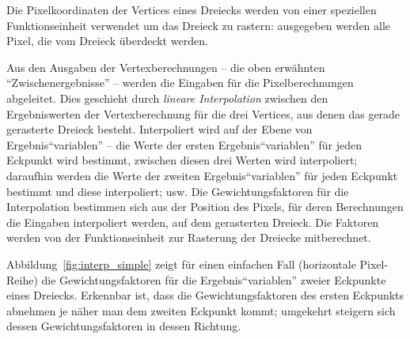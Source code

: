\documentclass[twoside,a4paper,fleqn,12pt]{book}
\begin{document}
Die Pixelkoordinaten der Vertices eines Dreiecks werden von einer speziellen Funktionseinheit verwendet um das Dreieck zu rastern:
ausgegeben werden alle Pixel, die vom Dreieck überdeckt werden. 

Aus den Ausgaben der Vertexberechnungen -- die oben erwähnten "`Zwischenergebnisse"' -- werden die Eingaben für die Pixelberechnungen abgeleitet.
Dies geschieht durch \emph{lineare Interpolation} zwischen den Ergebniswerten der Vertexberechnung für die drei Vertices, aus denen das gerade gerasterte
Dreieck besteht. Interpoliert wird auf der Ebene von Ergebnis"`variablen"' -- die Werte der ersten Ergebnis"`variablen"' für jeden Eckpunkt wird bestimmt,
zwischen diesen drei Werten wird interpoliert; daraufhin werden die Werte der zweiten Ergebnis"`variablen"' für jeden Eckpunkt bestimmt
und diese interpoliert; usw. Die Gewichtungsfaktoren für die Interpolation bestimmen sich aus der Position des Pixels, für deren Berechnungen
die Eingaben interpoliert werden, auf dem gerasterten Dreieck. Die Faktoren werden von der Funktionseinheit zur Rasterung der Dreiecke mitberechnet.

Abbildung~\ref{fig:interp_simple} zeigt für einen einfachen Fall (horizontale Pixel-Reihe) die Gewichtungsfaktoren für die Ergebnis"`variablen"'
zweier Eckpunkte eines Dreiecks. Erkennbar ist, dass die Gewichtungsfaktoren des ersten Eckpunkts abnehmen je näher man
dem zweiten Eckpunkt kommt; umgekehrt steigern sich dessen Gewichtungsfaktoren in dessen Richtung.
\end{document}
